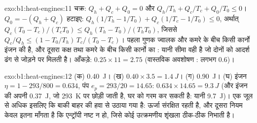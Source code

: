 \begin{solution}{exo:b1:heat-engines:11}
चक्र: $Q_h + Q_c + Q_0 = 0$ और $Q_h/T_h + Q_c/T_c + Q_0/T_0 \leq 0$।
$Q_0 = -(Q_h + Q_c)$ हटाइए: $Q_h(1/T_h - 1/T_0) + Q_c(1/T_c - 1/T_0) \leq 0$,
अर्थात् $Q_c(T_0 - T_c)/(T_cT_0) \leq Q_h(T_h - T_0)/(T_hT_0)$, जिससे
$Q_c/Q_h \leq (1 - T_0/T_h)\,T_c/(T_0 - T_c)$। पहला गुणक ज्वालक और कमरे के
बीच किसी कार्नो इंजन की  है, और दूसरा कक्ष तथा कमरे के बीच किसी
कार्नो  का : यानी सीमा वही है जो दोनों को आदर्श ढंग
से जोड़ने पर मिलती है। आँकड़े: $0.25 \times 11 = 2.75$
(वास्तविक अवशोषण : लगभग $0.6$)।
\end{solution}

\begin{solution}{exo:b1:heat-engines:12}
(क) \qty{0.40}{J}। (ख) $0.40 \times 3.5 = \qty{1.4}{J}$। (ग) \qty{0.90}{J}।
(घ) इंजन $\eta = 1 - 293/800 = 0.634$, पंप $e_p = 293/20 = 14.65$:
$0.634 \times 14.65 = \qty{9.3}{J}$ (और इंजन की अपनी \qty{0.37}{J}, जो
\qty{293}{K} पर छोड़ी जाती है, घर को गरम कर सकती है: यानी \qty{9.7}{J})। एक
जूल से अधिक इसलिए कि बाकी बाहर की हवा से उठाया गया है: ऊर्जा संरक्षित रहती
है, और दूसरा नियम केवल इतना माँगता है कि एन्ट्रॉपी नष्ट न हो, जिसे कोई
उत्क्रमणीय शृंखला ठीक-ठीक निभाती है।
\end{solution}

